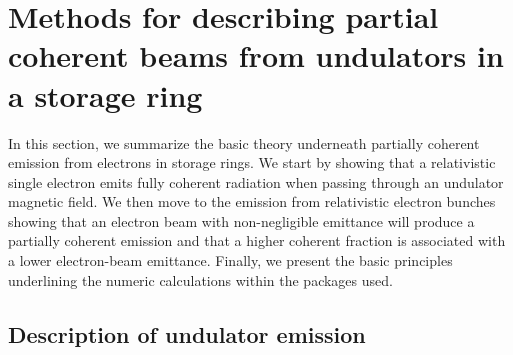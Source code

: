 \documentclass[preprint]{iucr}
\newcommand{\inred}[1]{{\color{red}#1}}
\begin{document}
\section{Methods for describing partial coherent beams from undulators in a storage ring}\label{sec:part_coh}

In this section\inred{,} we summarize the basic theory underneath partially coherent emission from electrons in storage rings. We start \inred{by} showing that a relativistic single electron emits fully coherent radiation when passing through an undulator magnetic field. We then move to the emission from relativistic electron bunches showing that an electron beam with non-negligible emittance will produce a partially coherent emission and that a higher coherent fraction is associated with a lower electron-beam emittance. Finally, we present the basic principles underlining the numeric calculations within the packages used.


\subsection{Description of undulator emission}
\label{sec:undulator}
\end{document}
